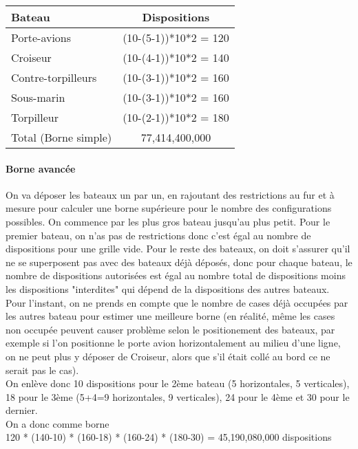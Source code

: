 \documentclass[12pt]{article}
\begin{document}
            \clearpage
            \begin{table}[!ht]
                \begin{tabular}{|l|c|}
                \hline
                Bateau               & Dispositions \\ \hline
                Porte-avions         & (10-(5-1))*10*2 = 120 \\ \hline
                Croiseur             & (10-(4-1))*10*2 = 140 \\ \hline
                Contre-torpilleurs   & (10-(3-1))*10*2 = 160 \\ \hline
                Sous-marin           & (10-(3-1))*10*2 = 160 \\ \hline
                Torpilleur           & (10-(2-1))*10*2 = 180 \\ \hline
                Total (Borne simple) & 77,414,400,000        \\ \hline
                \end{tabular}
                \end{table}

        \paragraph{Borne avancée}
            On va déposer les bateaux un par un, en rajoutant des restrictions au fur et à mesure pour calculer une borne supérieure pour le nombre des configurations possibles. On commence par les plus gros bateau jusqu'au plus petit.
            Pour le premier bateau, on n'as pas de restrictions donc c'est égal au nombre de dispositions pour une grille vide.
            Pour le reste des bateaux, on doit s'assurer qu'il ne se superposent pas avec des bateaux déjà déposés, donc pour chaque bateau, le nombre de dispositions autorisées est égal au nombre total de dispositions moins les dispositions "interdites" qui dépend de la dispositions des autres bateaux.\\
            Pour l'instant, on ne prends en compte que le nombre de cases déjà occupées par les autres bateau pour estimer une meilleure borne (en réalité, même les cases non occupée peuvent causer problème selon le positionement des bateaux, par exemple si l'on positionne le porte avion horizontalement au milieu d'une ligne, on ne peut plus y déposer de Croiseur, alors que s'il était collé au bord ce ne serait pas le cas).\\
            On enlève donc 10 dispositions pour le 2ème bateau (5 horizontales, 5 verticales), 18 pour le 3ème (5+4=9 horizontales, 9 verticales), 24 pour le 4ème et 30 pour le dernier. \\
            On a donc comme borne \\120 * (140-10) * (160-18) * (160-24) * (180-30) = 45,190,080,000 dispositions
\end{document}
